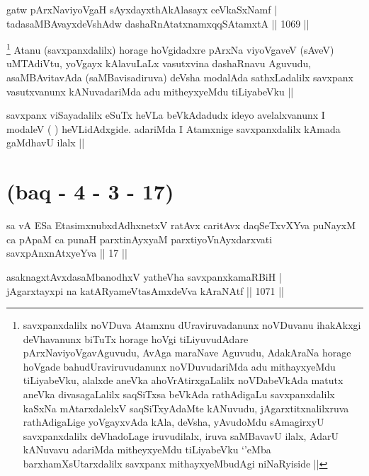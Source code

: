 \begin{shl}
gatw pArxNaviyoVgaH sAyxdayxthAkAlasayx ceVkaSxNamf | \\
tadasaMBAvayxdeVshAdw dashaRnAtatxnamxqqSAtamxtA \hfill||  1069 ||  
\end{shl}

\begin{artha}
\footnote{savxpanxdalilx noVDuva Atamxnu dUraviruvadanunx noVDuvanu ihakAkxgi deVhavanunx biTuTx horage hoVgi tiLiyuvudAdare pArxNaviyoVgavAguvudu, AvAga maraNave Aguvudu, AdakAraNa horage hoVgade bahudUraviruvudanunx noVDuvudariMda adu mithayxyeMdu tiLiyabeVku, alalxde aneVka ahoVrAtirxgaLalilx noVDabeVkAda matutx aneVka divasagaLalilx saqSiTxsa beVkAda rathAdigaLu savxpanxdalilx kaSxNa mAtarxdalelxV saqSiTxyAdaMte kANuvudu, jAgarxtitxnalilxruva rathAdigaLige yoVgayxvAda kAla, deVsha, yAvudoMdu sAmagirxyU savxpanxdalilx deVhadoLage iruvudilalx, iruva saMBavavU ilalx, AdarU kANuvavu adariMda mitheyxyeMdu tiLiyabeVku `\stext'eMba barxhamXsUtarxdalilx savxpanx mithayxyeMbudAgi niNaRyiside ||}
Atanu (savxpanxdalilx) horage hoVgidadxre pArxNa viyoVgaveV (sAveV) uMTAdiVtu, yoVgayx kAlavuLaLx vasutxvina dashaRnavu Aguvudu, asaMBAvitavAda (saMBavisadiruva) deVsha modalAda sathxLadalilx savxpanx vasutxvanunx kANuvadariMda adu mitheyxyeMdu tiLiyabeVku ||
\end{artha}

\begin{artha}
savxpanx viSayadalilx eSuTx heVLa beVkAdadudx ideyo avelalxvanunx I modaleV ( ) heVLidAdxgide. adariMda I Atamxnige savxpanxdalilx kAmada gaMdhavU ilalx ||
\end{artha}

\section*{(baq - 4 - 3 - 17)}
 
 \begin{shl}
sa vA ESa EtasimxnubxdAdhxnetxV ratAvx caritAvx daqSeTxvXYva puNayxM ca pApaM ca punaH parxtinAyxyaM parxtiyoVnAyxdarxvati savxpAnxnAtxyeYva || 17 ||
\end{shl}
 

\begin{shl}
asaknagxtAvxdasaMbanodhxV yatheVha savxpanxkamaRBiH | \\
jAgarxtayxpi na katAR\s yameVtasAmxdeVva kAraNAtf \hfill||  1071 ||  
\end{shl}

